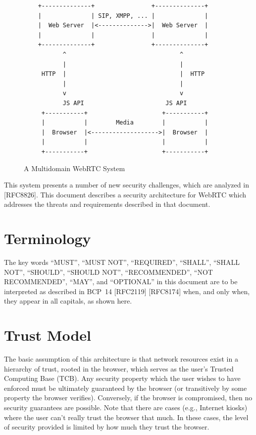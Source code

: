 \documentclass{article}
\begin{document}
\begin{figure}[ht]
\begin{verbatim}
    +--------------+                +--------------+
    |              | SIP, XMPP, ... |              |
    |  Web Server  |<-------------->|  Web Server  |
    |              |                |              |
    +--------------+                +--------------+
           ^                                ^
           |                                |
     HTTP  |                                |  HTTP
           |                                |
           v                                v
           JS API                       JS API
     +-----------+                     +-----------+
     |           |        Media        |           |
     |  Browser  |<------------------->|  Browser  |
     |           |                     |           |
     +-----------+                     +-----------+
\end{verbatim}
\caption{A Multidomain WebRTC System}
\label{fig:multidomain-webrtc}
\end{figure}

This system presents a number of new security challenges, which are
analyzed in [RFC8826].  This document describes a security
architecture for WebRTC which addresses the threats and requirements
described in that document.

\section{Terminology}

The key words ``MUST'', ``MUST NOT'', ``REQUIRED'', ``SHALL'', ``SHALL NOT'',
``SHOULD'', ``SHOULD NOT'', ``RECOMMENDED'', ``NOT RECOMMENDED'', ``MAY'', and
``OPTIONAL'' in this document are to be interpreted as described in
BCP~14 [RFC2119] [RFC8174] when, and only when, they appear in all
capitals, as shown here.

\section{Trust Model}

The basic assumption of this architecture is that network resources
exist in a hierarchy of trust, rooted in the browser, which serves as
the user's Trusted Computing Base (TCB).  Any security property which
the user wishes to have enforced must be ultimately guaranteed by the
browser (or transitively by some property the browser verifies).
Conversely, if the browser is compromised, then no security
guarantees are possible.  Note that there are cases (e.g., Internet
kiosks) where the user can't really trust the browser that much.  In
these cases, the level of security provided is limited by how much
they trust the browser.
\end{document}
